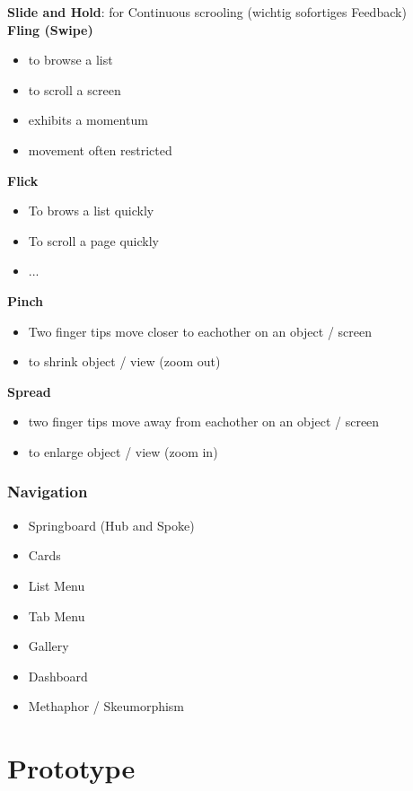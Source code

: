 \documentclass{report}
\theoremstyle{definition}
\theoremstyle{example}
\begin{document}
\textbf{Slide and Hold}: for Continuous scrooling (wichtig sofortiges Feedback)\\

\textbf{Fling (Swipe)}
\begin{itemize}
   \item to browse a list
   \item to scroll a screen
   \item exhibits a momentum
   \item movement often restricted
\end{itemize}

\textbf{Flick}
\begin{itemize}
   \item To brows a list quickly
   \item To scroll a page quickly
   \item ...
\end{itemize}

\textbf{Pinch}
\begin{itemize}
   \item Two finger tips move closer to eachother on an object / screen
   \item to shrink object / view (zoom out)
\end{itemize}

\textbf{Spread}
\begin{itemize}
   \item two finger tips move away from eachother on an object / screen
   \item to enlarge object / view (zoom in)
\end{itemize}

\subsubsection{Navigation}
\begin{itemize}
   \item Springboard (Hub and Spoke)
   \item Cards 
   \item List Menu 
   \item Tab Menu 
   \item Gallery
   \item Dashboard
   \item Methaphor / Skeumorphism
\end{itemize}

\section{Prototype}
\end{document}
